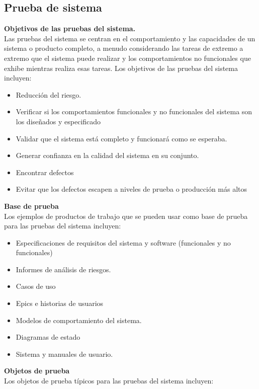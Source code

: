 \subsection{Prueba de sistema}

\textbf {Objetivos de las pruebas del sistema.}\\

Las pruebas del sistema se centran en el comportamiento y las capacidades de un sistema o producto completo, a menudo considerando las tareas de extremo a extremo que el sistema puede realizar y los comportamientos no funcionales que exhibe mientras realiza esas tareas. Los objetivos de las pruebas del sistema incluyen:

\begin{itemize}
	\item Reducción del riesgo.
	\item Verificar si los comportamientos funcionales y no funcionales del sistema son los diseñados y
	especificado
	\item Validar que el sistema está completo y funcionará como se esperaba.
	\item Generar confianza en la calidad del sistema en su conjunto.
	\item Encontrar defectos
	\item Evitar que los defectos escapen a niveles de prueba o producción más altos
\end{itemize}

\textbf {Base de prueba}\\
Los ejemplos de productos de trabajo que se pueden usar como base de prueba para las pruebas del sistema incluyen:

\begin{itemize}
	\item Especificaciones de requisitos del sistema y software (funcionales y no funcionales)
	\item Informes de análisis de riesgos.
	\item Casos de uso
	\item Epics e historias de usuarios
	\item Modelos de comportamiento del sistema.
	\item Diagramas de estado
	\item Sistema y manuales de usuario.
\end{itemize}

\textbf {Objetos de prueba}\\
Los objetos de prueba típicos para las pruebas del sistema incluyen:

